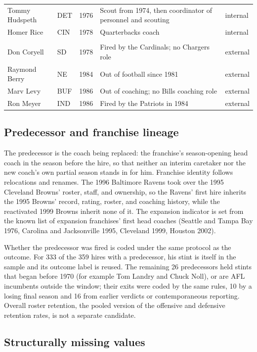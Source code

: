 \documentclass[12pt,USenglish]{article}
\begin{document}
{\begin{longtable}{@{}l l c p{5.4cm} l@{}}
Tommy Hudspeth & DET & 1976 & Scout from 1974, then coordinator of personnel and scouting & internal \\
Homer Rice & CIN & 1978 & Quarterbacks coach & internal \\
\addlinespace
\multicolumn{5}{@{}l}{\emph{Hired from outside as permanent head coach}}\\[2pt]
Don Coryell & SD & 1978 & Fired by the Cardinals; no Chargers role & external \\
Raymond Berry & NE & 1984 & Out of football since 1981 & external \\
Marv Levy & BUF & 1986 & Out of coaching; no Bills coaching role & external \\
Ron Meyer & IND & 1986 & Fired by the Patriots in 1984 & external \\
\end{longtable}
}

\subsection{Predecessor and franchise lineage}
\label{sec:supp_lineage}

The predecessor is the coach being replaced: the franchise's season-opening head coach in the
season before the hire, so that neither an interim caretaker nor the new coach's own partial
season stands in for him. Franchise identity follows relocations and renames. The 1996
Baltimore Ravens took over the 1995 Cleveland Browns' roster, staff, and ownership, so the
Ravens' first hire inherits the 1995 Browns' record, rating, roster, and coaching history,
while the reactivated 1999 Browns inherit none of it. The expansion indicator is set from the
known list of expansion franchises' first head coaches (Seattle and Tampa Bay 1976, Carolina
and Jacksonville 1995, Cleveland 1999, Houston 2002).

Whether the predecessor was fired is coded under the same protocol as the outcome. For 333
of the 359 hires with a predecessor, his stint is itself in the sample and its outcome label
is reused. The remaining 26 predecessors held stints that began before 1970 (for example
Tom Landry and Chuck Noll), or are AFL incumbents outside the window; their exits were coded
by the same rules, 10 by a losing final season and 16 from earlier verdicts or contemporaneous
reporting. Overall roster retention, the pooled version of the offensive and defensive
retention rates, is not a separate candidate.

\subsection{Structurally missing values}
\label{sec:supp_missing}
\end{document}
